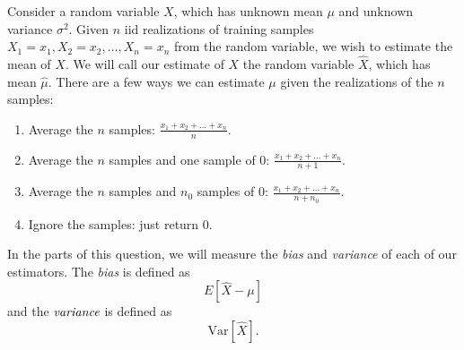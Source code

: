 \documentclass[preview]{standalone}
\begin{document}

Consider a random variable $X$, which has unknown mean $\mu$ and
unknown variance $\sigma^2$. Given $n$ iid realizations of training samples $X_1=x_1,
X_2=x_2, \ldots, X_n=x_n$ from the random variable, we wish to
estimate the mean of $X$. We will call our estimate of $X$ the random variable
$\hat{X}$, which has mean $\hat{\mu}$. There are a few ways we can estimate
$\mu$ given the realizations of the $n$ samples:
\begin{enumerate}
	\item Average the $n$ samples: $\frac{x_1+x_2+\ldots+x_n}{n}$.
	\item Average the $n$ samples and one sample of $0$: $\frac{x_1+x_2+\ldots+x_n}{n+1}$.
	\item Average the $n$ samples and $n_0$ samples of $0$: $\frac{x_1+x_2+\ldots+x_n}{n+n_0}$.
	\item Ignore the samples: just return $0$.
\end{enumerate}

In the parts of this question, we will measure the \emph{bias} and \emph{variance} of each of our estimators. 
The \emph{bias} is defined as $$E[\hat{X} - \mu]$$ and the $\emph{variance}$ is defined as $$\text{Var}[\hat{X}].$$
\end{document}
